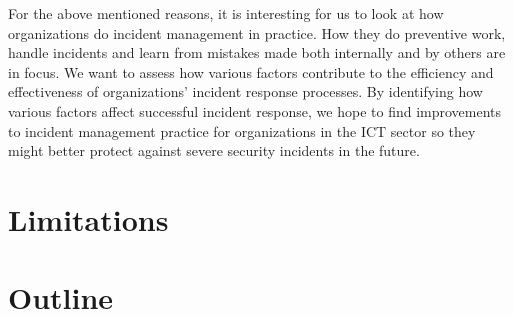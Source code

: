 For the above mentioned reasons, it is interesting for us to look at how organizations do incident management in practice. How they do preventive work, handle incidents and learn from mistakes made both internally and by others are in focus. We want to assess how various factors contribute to the efficiency and effectiveness of organizations’ incident response processes. By identifying how various factors affect successful incident response, we hope to find improvements to incident management practice for organizations in the ICT sector so they might better protect against severe security incidents in the future. 





\section{Limitations}

\section{Outline}